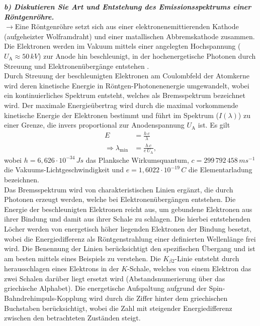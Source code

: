 \textbf{\textit{b) Diskutieren Sie Art und Entstehung des Emissionsspektrums einer 
Röntgenröhre.}}\\
$\rightarrow$Eine Röntgenröhre setzt sich aus einer elektronenemittierenden Kathode (aufgeheizter Wolframdraht) und einer 
matallischen Abbremskathode zusammen. Die Elektronen werden im Vakuum mittels einer angelegten Hochspannung 
($U_{\text{A}}\approx 50\,\si{kV}$)
zur Anode hin beschleunigt, in der hochenergetische Photonen durch Streuung und Elektronenübergänge entstehen \cite{Kristall}. \\
Durch Streuung der beschleunigten Elektronen am Coulombfeld der Atomkerne wird deren 
kinetische Energie in Röntgen-Photonenenergie umgewandelt, wobei ein kontinuierliches Spektrum entsteht, welches 
als Bremsspektrum bezeichnet wird. Der maximale Energieübertrag wird durch die maximal vorkommende kinetische 
Energie der Elektronen bestimmt und führt im Spektrum ($I(\lambda)$) zu einer Grenze, die invers proportional
zur Anodenspannung $U_{\text{A}}$ ist. Es gilt
\begin{align}
    E &= \frac{h\,c}{\lambda} \\
    \Rightarrow \lambda_{\text{min}} &= \frac{h\,c}{e\,U_{\text{A}}},
\end{align}
wobei $h = 6,626\cdot 10^{-34}\,\si{Js}$ das Planksche Wirkumsquantum, $c = 299\,792\,458\,\si{ms^{-1}}$ die Vakuums-Lichtgeschwindigkeit
und $e = 1,6022\cdot 10^{-19}\,\si{C}$ die Elementarladung bezeichnen. \\
Das Bremsspektrum wird von charakteristischen Linien ergänzt, die durch Photonen erzeugt werden, welche bei 
Elektronenübergängen entstehen. Die Energie der beschleunigten Elektronen reicht aus, um gebundene Elektronen 
aus ihrer Bindung und damit aus ihrer Schale zu schlagen. Die hierbei entstehenden Löcher werden von energetisch 
höher liegenden Elektronen der Bindung besetzt, wobei die Energiedifferenz als Röntgenstrahlung einer definierten 
Wellenlänge frei wird. Die Benennung der Linien berücksichtigt den spezifischen Übergang und ist 
am besten mittels eines Beispiels zu verstehen. Die $K_{\beta 2}$-Linie entsteht durch herausschlagen 
eines Elektrons in der $K$-Schale, welches von einem Elektron das zwei Schalen darüber liegt ersetzt wird  
(Abstandsnumerierung über das griechische Alphabet). Die energetische Aufspaltung aufgrund der 
Spin-Bahndrehimpuls-Kopplung wird durch die Ziffer hinter dem griechischen Buchstaben berücksichtigt,  
wobei die Zahl mit steigender Energiedifferenz zwischen den betrachteten Zuständen steigt. \\
